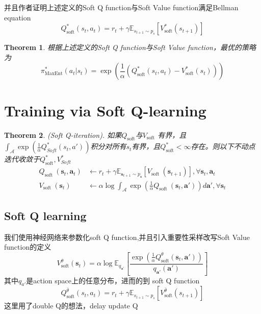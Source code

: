 \documentclass{article}
\newcommand{\nobracket}{}
\newcommand{\tmop}[1]{\ensuremath{\operatorname{#1}}}
\newtheorem{theorem}{Theorem}
\begin{document}
\begin{CJK*}{UTF8}{gbsn}
并且作者证明上述定义的Soft Q function与Soft Value
function满足Bellman equation
\[ Q^{\ast}_{\tmop{soft}} (s_t, a_t) = r_t + \gamma \mathbb{E}_{s_{t + 1} \sim
   p _s} [V_{\tmop{soft}}^{\ast} (s_{t + 1})] \]
\begin{theorem}
  根据上述定义的Soft Q function与Soft Value
  function，最优的策略为
  \[ \pi^{\ast}_{\tmop{MaxEnt}} (a_t | \nobracket s_t) = \exp \left(
     \frac{1}{\alpha} (Q^{\ast}_{\tmop{soft}} (s_t, a_t) -
     V_{\tmop{soft}}^{\ast} (s_t)) \right) \]
  
\end{theorem}

\section{Training via Soft Q-learning}

\begin{theorem}
  (Soft Q-iteration). 如果$Q_{\tmop{soft}}$与$V_{\tmop{soft}}$
  有界，且$\int_{\mathcal{A}} \exp \left( \frac{1}{\alpha} Q_{Soft}^{\ast}
  (s_t, a') \right)$积分对所有$s_t$有界，且$Q_{\tmop{soft}}^{\ast} <
  \infty$存在。则以下不动点迭代收敛于$Q_{\tmop{soft}}^{\ast},
  V_{Soft}^{\ast}$
  \[ \begin{aligned}
       Q_{\text{soft }} (\mathbf{s}_t, \mathbf{a}_t) & \leftarrow r_t + \gamma
       \mathbb{E}_{\mathbf{s}_{t + 1} \sim p_{\mathbf{s}}} \left[
       V_{\text{soft }} (\mathbf{s}_{t + 1}) \right], \forall \mathbf{s}_t,
       \mathbf{a}_t\\
       V_{\text{soft }} (\mathbf{s}_t) & \leftarrow \alpha \log
       \int_{\mathcal{A}} \exp \left( \frac{1}{\alpha} Q_{\text{soft }}
       (\mathbf{s}_t, \mathbf{a}') \right) d \mathbf{a}', \forall \mathbf{s}_t
     \end{aligned} \]
\end{theorem}

\subsection{Soft Q learning}

我们使用神经网络来参数化soft Q
function,并且引入重要性采样改写Soft Value function的定义
\[ V_{\mathrm{soft}}^{\theta} (\mathbf{s}_t) = \alpha \log
   \mathbb{E}_{q_{\mathbf{a}'}} \left[ \frac{\exp \left( \frac{1}{\alpha}
   Q_{\mathrm{soft}}^{\theta} (\mathbf{s}_t, \mathbf{a}')
   \right)}{q_{\mathbf{a}'} (\mathbf{a}')} \right] \]
其中$q_{a'}$是action space上的任意分布，进而的到 soft Q function
\[ Q_{\tmop{soft}}^{\bar{\theta}} (s_t, a_t) = r_t + \gamma \mathbb{E}_{s_{t +
   1} \sim p_s} [V_{\tmop{soft}}^{\bar{\theta}} (s_{t + 1})] \]
这里用了double Q的想法，delay update Q


\end{CJK*}
\end{document}
